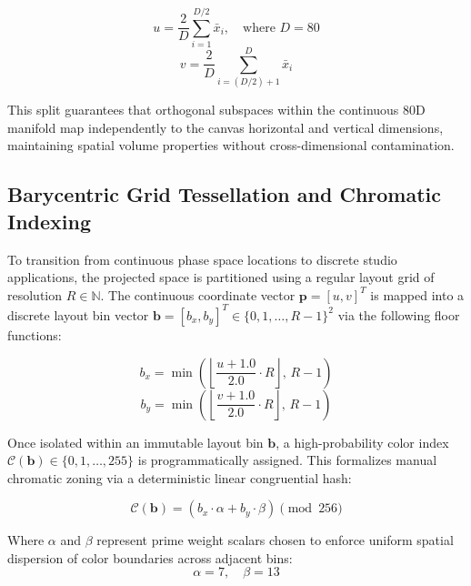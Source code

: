 \begin{equation}
    u = \frac{2}{D} \sum_{i=1}^{D/2} \bar{x}_i, \quad \text{where } D = 80
\end{equation}
\begin{equation}
    v = \frac{2}{D} \sum_{i=(D/2)+1}^{D} \bar{x}_i
\end{equation}

This split guarantees that orthogonal subspaces within the continuous 80D manifold map independently to the canvas horizontal and vertical dimensions, maintaining spatial volume properties without cross-dimensional contamination.

\subsection{Barycentric Grid Tessellation and Chromatic Indexing}
To transition from continuous phase space locations to discrete studio applications, the projected space is partitioned using a regular layout grid of resolution $R \in \mathbb{N}$. The continuous coordinate vector $\mathbf{p} = [u, v]^T$ is mapped into a discrete layout bin vector $\mathbf{b} = [b_x, b_y]^T \in \{0, 1, \dots, R-1\}^2$ via the following floor functions:

\begin{equation}
    b_x = \min\left(\left\lfloor \frac{u + 1.0}{2.0} \cdot R \right\rfloor, \, R - 1\right)
\end{equation}
\begin{equation}
    b_y = \min\left(\left\lfloor \frac{v + 1.0}{2.0} \cdot R \right\rfloor, \, R - 1\right)
\end{equation}

Once isolated within an immutable layout bin $\mathbf{b}$, a high-probability color index $\mathcal{C}(\mathbf{b}) \in \{0, 1, \dots, 255\}$ is programmatically assigned. This formalizes manual chromatic zoning via a deterministic linear congruential hash:

\begin{equation}
    \mathcal{C}(\mathbf{b}) = (b_x \cdot \alpha + b_y \cdot \beta) \pmod{256}
\end{equation}

Where $\alpha$ and $\beta$ represent prime weight scalars chosen to enforce uniform spatial dispersion of color boundaries across adjacent bins:
\begin{equation}
    \alpha = 7, \quad \beta = 13
\end{equation}
